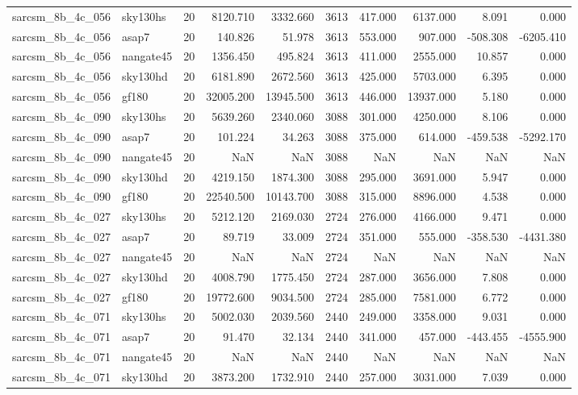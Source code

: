 \begin{tabular}{llrrrrrrrr}
sarcsm\_8b\_4c\_056 & sky130hs & 20 & 8120.710 & 3332.660 & 3613 & 417.000 & 6137.000 & 8.091 & 0.000 \\
sarcsm\_8b\_4c\_056 & asap7 & 20 & 140.826 & 51.978 & 3613 & 553.000 & 907.000 & -508.308 & -6205.410 \\
sarcsm\_8b\_4c\_056 & nangate45 & 20 & 1356.450 & 495.824 & 3613 & 411.000 & 2555.000 & 10.857 & 0.000 \\
sarcsm\_8b\_4c\_056 & sky130hd & 20 & 6181.890 & 2672.560 & 3613 & 425.000 & 5703.000 & 6.395 & 0.000 \\
sarcsm\_8b\_4c\_056 & gf180 & 20 & 32005.200 & 13945.500 & 3613 & 446.000 & 13937.000 & 5.180 & 0.000 \\
sarcsm\_8b\_4c\_090 & sky130hs & 20 & 5639.260 & 2340.060 & 3088 & 301.000 & 4250.000 & 8.106 & 0.000 \\
sarcsm\_8b\_4c\_090 & asap7 & 20 & 101.224 & 34.263 & 3088 & 375.000 & 614.000 & -459.538 & -5292.170 \\
sarcsm\_8b\_4c\_090 & nangate45 & 20 & NaN & NaN & 3088 & NaN & NaN & NaN & NaN \\
sarcsm\_8b\_4c\_090 & sky130hd & 20 & 4219.150 & 1874.300 & 3088 & 295.000 & 3691.000 & 5.947 & 0.000 \\
sarcsm\_8b\_4c\_090 & gf180 & 20 & 22540.500 & 10143.700 & 3088 & 315.000 & 8896.000 & 4.538 & 0.000 \\
sarcsm\_8b\_4c\_027 & sky130hs & 20 & 5212.120 & 2169.030 & 2724 & 276.000 & 4166.000 & 9.471 & 0.000 \\
sarcsm\_8b\_4c\_027 & asap7 & 20 & 89.719 & 33.009 & 2724 & 351.000 & 555.000 & -358.530 & -4431.380 \\
sarcsm\_8b\_4c\_027 & nangate45 & 20 & NaN & NaN & 2724 & NaN & NaN & NaN & NaN \\
sarcsm\_8b\_4c\_027 & sky130hd & 20 & 4008.790 & 1775.450 & 2724 & 287.000 & 3656.000 & 7.808 & 0.000 \\
sarcsm\_8b\_4c\_027 & gf180 & 20 & 19772.600 & 9034.500 & 2724 & 285.000 & 7581.000 & 6.772 & 0.000 \\
sarcsm\_8b\_4c\_071 & sky130hs & 20 & 5002.030 & 2039.560 & 2440 & 249.000 & 3358.000 & 9.031 & 0.000 \\
sarcsm\_8b\_4c\_071 & asap7 & 20 & 91.470 & 32.134 & 2440 & 341.000 & 457.000 & -443.455 & -4555.900 \\
sarcsm\_8b\_4c\_071 & nangate45 & 20 & NaN & NaN & 2440 & NaN & NaN & NaN & NaN \\
sarcsm\_8b\_4c\_071 & sky130hd & 20 & 3873.200 & 1732.910 & 2440 & 257.000 & 3031.000 & 7.039 & 0.000 \\

\end{tabular}
